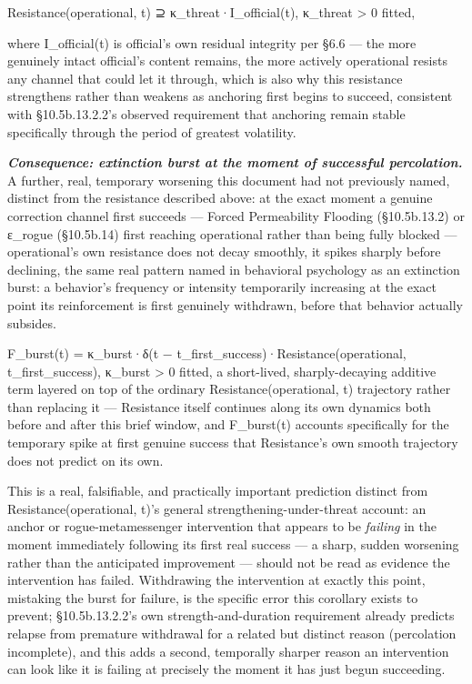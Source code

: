 \documentclass[
]{article}
\begin{document}
Resistance(operational, t) ⊇ κ\_threat·I\_official(t), κ\_threat
\textgreater{} 0 fitted,

where I\_official(t) is official's own residual integrity per §6.6 ---
the more genuinely intact official's content remains, the more actively
operational resists any channel that could let it through, which is also
why this resistance strengthens rather than weakens as anchoring first
begins to succeed, consistent with §10.5b.13.2.2's observed requirement
that anchoring remain stable specifically through the period of greatest
volatility.

\emph{\textbf{Consequence: extinction burst at the moment of successful
percolation.}} A further, real, temporary worsening this document had
not previously named, distinct from the resistance described above: at
the exact moment a genuine correction channel first succeeds --- Forced
Permeability Flooding (§10.5b.13.2) or ε\_rogue (§10.5b.14) first
reaching operational rather than being fully blocked --- operational's
own resistance does not decay smoothly, it spikes sharply before
declining, the same real pattern named in behavioral psychology as an
extinction burst: a behavior's frequency or intensity temporarily
increasing at the exact point its reinforcement is first genuinely
withdrawn, before that behavior actually subsides.

F\_burst(t) = κ\_burst·δ(t − t\_first\_success)·Resistance(operational,
t\_first\_success), κ\_burst \textgreater{} 0 fitted, a short-lived,
sharply-decaying additive term layered on top of the ordinary
Resistance(operational, t) trajectory rather than replacing it ---
Resistance itself continues along its own dynamics both before and after
this brief window, and F\_burst(t) accounts specifically for the
temporary spike at first genuine success that Resistance's own smooth
trajectory does not predict on its own.

This is a real, falsifiable, and practically important prediction
distinct from Resistance(operational, t)'s general
strengthening-under-threat account: an anchor or rogue-metamessenger
intervention that appears to be \emph{failing} in the moment immediately
following its first real success --- a sharp, sudden worsening rather
than the anticipated improvement --- should not be read as evidence the
intervention has failed. Withdrawing the intervention at exactly this
point, mistaking the burst for failure, is the specific error this
corollary exists to prevent; §10.5b.13.2.2's own strength-and-duration
requirement already predicts relapse from premature withdrawal for a
related but distinct reason (percolation incomplete), and this adds a
second, temporally sharper reason an intervention can look like it is
failing at precisely the moment it has just begun succeeding.
\end{document}
